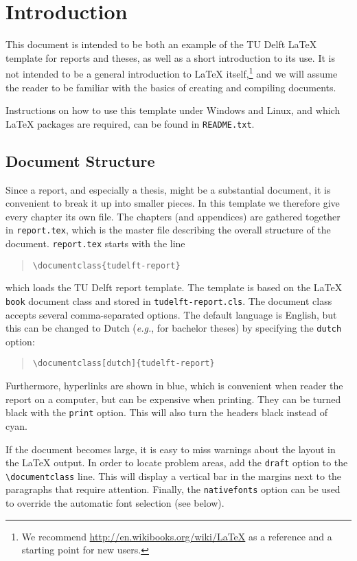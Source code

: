 \chapter{Introduction}

This document is intended to be both an example of the TU Delft \LaTeX{} template for reports and theses, as well as a short introduction to its use. It is not intended to be a general introduction to \LaTeX{} itself,\footnote{We recommend \url{http://en.wikibooks.org/wiki/LaTeX} as a reference and a starting point for new users.} and we will assume the reader to be familiar with the basics of creating and compiling documents.

Instructions on how to use this template under Windows and Linux, and which \LaTeX{} packages are required, can be found in \texttt{README.txt}.

\section{Document Structure}

Since a report, and especially a thesis, might be a substantial document, it is convenient to break it up into smaller pieces. In this template we therefore give every chapter its own file. The chapters (and appendices) are gathered together in \texttt{report.tex}, which is the master file describing the overall structure of the document. \texttt{report.tex} starts with the line
\begin{quote}
    \texttt{\textbackslash documentclass\{tudelft-report\}}
\end{quote}
which loads the TU Delft report template. The template is based on the \LaTeX{} \texttt{book} document class and stored in \texttt{tudelft-report.cls}. The document class accepts several comma-separated options. The default language is English, but this can be changed to Dutch (\emph{e.g.}, for bachelor theses) by specifying the \texttt{dutch} option:
\begin{quote}
    \texttt{\textbackslash documentclass[dutch]\{tudelft-report\}}
\end{quote}
Furthermore, hyperlinks are shown in blue, which is convenient when reader the report on a computer, but can be expensive when printing. They can be turned black with the \texttt{print} option. This will also turn the headers black instead of cyan.

If the document becomes large, it is easy to miss warnings about the layout in the \LaTeX{} output. In order to locate problem areas, add the \texttt{draft} option to the \texttt{\textbackslash documentclass} line. This will display a vertical bar in the margins next to the paragraphs that require attention. Finally, the \texttt{nativefonts} option can be used to override the automatic font selection (see below).

